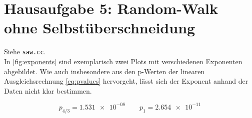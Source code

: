 \documentclass{scrartcl}
\begin{document}
\section*{Hausaufgabe 5: Random-Walk ohne Selbstüberschneidung}
Siehe \texttt{saw.cc}. \\

In \autoref{fig:exponents} sind exemplarisch zwei Plots mit verschiedenen Exponenten abgebildet. Wie auch insbesondere aus den p-Werten der linearen Ausgleichsrechnung \eqref{eq:pvalues} hervorgeht, lässt sich der Exponent anhand der Daten nicht klar bestimmen.

\begin{equation} \label{eq:pvalues}
    p_{4/3} = \num{1.531e-08} \quad\quad p_1 = \num{2.654e-11}
\end{equation}
\end{document}
